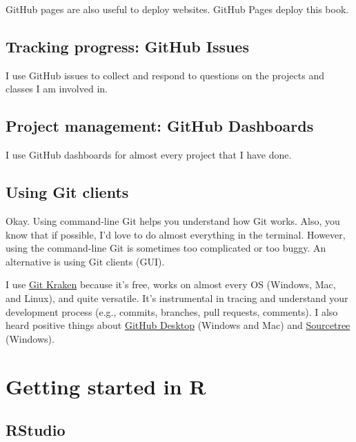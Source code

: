 \documentclass[
]{book}
\begin{document}
GitHub pages are also useful to deploy websites. GitHub Pages deploy this book.

\hypertarget{tracking-progress-github-issues}{%
\subsection{Tracking progress: GitHub Issues}\label{tracking-progress-github-issues}}

I use GitHub issues to collect and respond to questions on the projects and classes I am involved in.

\hypertarget{project-management-github-dashboards}{%
\subsection{Project management: GitHub Dashboards}\label{project-management-github-dashboards}}

I use GitHub dashboards for almost every project that I have done.

\hypertarget{using-git-clients}{%
\subsection{Using Git clients}\label{using-git-clients}}

Okay. Using command-line Git helps you understand how Git works. Also, you know that if possible, I'd love to do almost everything in the terminal. However, using the command-line Git is sometimes too complicated or too buggy. An alternative is using Git clients (GUI).

I use \href{https://www.gitkraken.com/}{Git Kraken} because it's free, works on almost every OS (Windows, Mac, and Linux), and quite versatile. It's instrumental in tracing and understand your development process (e.g., commits, branches, pull requests, comments). I also heard positive things about \href{https://desktop.github.com/}{GitHub Desktop} (Windows and Mac) and \href{https://www.sourcetreeapp.com/}{Sourcetree} (Windows).

\hypertarget{getting-started-in-r}{%
\section{Getting started in R}\label{getting-started-in-r}}

\hypertarget{rstudio}{%
\subsection{RStudio}\label{rstudio}}
\end{document}

